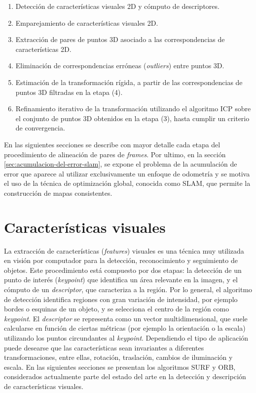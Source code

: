 \begin{enumerate}
\item Detección de características visuales 2D y cómputo de descriptores.

\item Emparejamiento de características visuales 2D.

\item Extracción de pares de puntos 3D asociado a las correspondencias de características 2D.

\item Eliminación de correspondencias erróneas (\textit{outliers}) entre puntos 3D.

\item Estimación de la transformación rígida, a partir de las correspondencias de puntos 3D filtradas en la etapa (4).

\item Refinamiento iterativo de la transformación utilizando el algoritmo ICP sobre el conjunto de puntos 3D obtenidos en la etapa (3), hasta cumplir un criterio de convergencia.
\end{enumerate}

En las siguientes secciones se describe con mayor detalle cada etapa del procedimiento de alineación de pares de \textit{frames}. Por ultimo, en la sección \ref{sec:acumulacion-del-error-slam}, se expone el problema de la acumulación de error que aparece al utilizar exclusivamente un enfoque de odometría y se motiva el uso de la técnica de optimización global, conocida como SLAM, que permite la construcción de mapas consistentes.

\section{Características visuales}
\label{sec:features}

La extracción de características (\textit{features}) visuales es una técnica muy utilizada en visión por computador para la detección, reconocimiento y seguimiento de objetos. Este procedimiento está compuesto por dos etapas: la detección de un punto de interés (\textit{keypoint}) que identifica un área relevante en la imagen, y el cómputo de un \textit{descriptor}, que caracteriza a la región. Por lo general, el algoritmo de detección identifica regiones con gran variación de intensidad, por ejemplo bordes o esquinas de un objeto, y se selecciona el centro de la región como \textit{keypoint}. El \textit{descriptor} se representa como un vector multidimensional, que suele calcularse en función de ciertas métricas (por ejemplo la orientación o la escala) utilizando los puntos circundantes al \textit{keypoint}. Dependiendo el tipo de aplicación puede desearse que las características sean invariantes a diferentes transformaciones, entre ellas, rotación, traslación, cambios de iluminación y escala. En las siguientes secciones se presentan los algoritmos SURF y ORB, considerados actualmente parte del estado del arte en la detección y descripción de características visuales.

